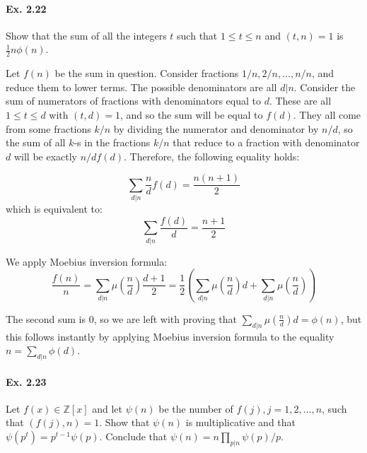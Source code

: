 \documentclass[notitlepage]{article}
\theoremstyle{definition}
\newcommand\Z{\mathbb{Z}}
\begin{document}
\paragraph{Ex. 2.22}
Show that the sum of all the integers $t$ such that $1 \leq t \leq n$ and $(t,
n) = 1$ is $\frac{1}{2} n \phi(n)$.

Let $f(n)$ be the sum in question. Consider fractions $1/n, 2/n,
\ldots, n/n$, and reduce them to lower terms. The possible
denominators are all $d|n$. Consider the sum of numerators of
fractions with denominators equal to $d$. These are all $1 \leq t \leq
d$ with $(t, d) = 1$, and so the sum will be equal to $f(d)$. They all
come from some fractions $k/n$ by dividing the numerator and
denominator by $n/d$, so the sum of all $k$-s in the fractions $k/n$
that reduce to a fraction with denominator $d$ will be exactly $n/d
f(d)$. Therefore, the following equality holds:

\begin{equation}
  \sum_{d|n} \frac{n}{d} f(d) = \frac{n(n+1)}{2}
\end{equation}
which is equivalent to:
\begin{equation}
  \sum_{d|n} \frac{f(d)}{d} = \frac{n+1}{2}
\end{equation}

We apply Moebius inversion formula:
\begin{equation}
  \frac{f(n)}{n} = \sum_{d|n}\mu\left(\frac{n}{d}\right) \frac{d+1}{2} =
  \frac{1}{2}\left(\sum_{d|n}\mu\left(\frac{n}{d}\right)d +
  \sum_{d|n}\mu\left(\frac{n}{d}\right)\right)
\end{equation}

The second sum is 0, so we are left with proving that
$\sum_{d|n}\mu\left(\frac{n}{d}\right)d = \phi(n)$, but this follows
instantly by applying Moebius inversion formula to the equality $n =
\sum_{d|n} \phi(d)$.

\paragraph{Ex. 2.23}
Let $f(x) \in \Z[x]$ and let $\psi(n)$ be the number of $f(j), j = 1,2, \ldots, n$,
such that $(f(j), n) = 1$. Show that $\psi(n)$ is multiplicative and that
$\psi(p^t) = p^{t-1} \psi(p)$. Conclude that $\psi(n) = n \prod_{p|n} \psi(p)/p$.
\end{document}
